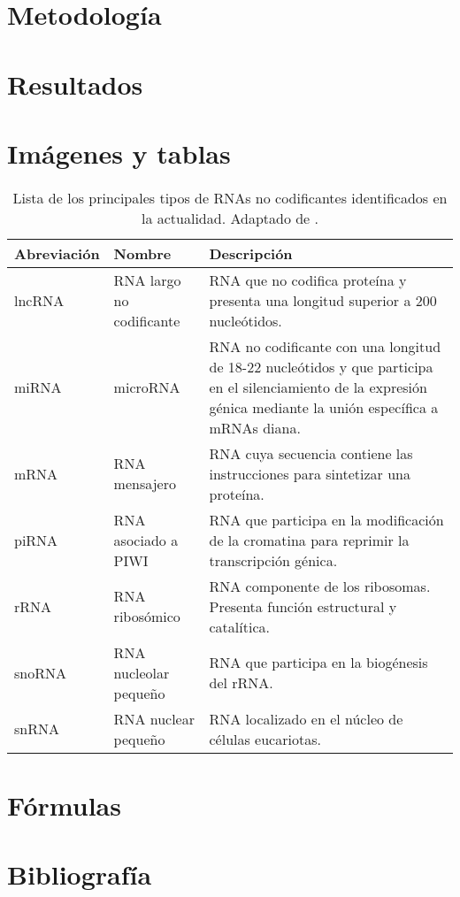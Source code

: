 \documentclass[a4paper,11pt]{article}
\begin{document}
\section{Metodología}


\section{Resultados}



\section{Imágenes y tablas}

\begin{table}
\begin{tabular}{p{2cm}p{5cm}p{9cm}}
\textbf{Abreviación} & \textbf{Nombre} & \textbf{Descripción} \\
\hline
lncRNA & RNA largo no codificante & RNA que no codifica proteína y presenta una longitud superior a 200 nucleótidos. \\
miRNA & microRNA & RNA no codificante con una longitud de 18-22 nucleótidos y que participa en el silenciamiento de la expresión génica mediante la unión específica a mRNAs diana. \\
mRNA & RNA mensajero & RNA cuya secuencia contiene las instrucciones para sintetizar una proteína. \\
piRNA & RNA asociado a PIWI & RNA que participa en la modificación de la cromatina para reprimir la transcripción génica. \\
rRNA & RNA ribosómico & RNA componente de los ribosomas. Presenta función estructural y catalítica. \\
snoRNA & RNA nucleolar pequeño & RNA que participa en la biogénesis del rRNA. \\
snRNA & RNA nuclear pequeño & RNA localizado en el núcleo de células eucariotas. \\
\hline
\end{tabular}
\caption{Lista de los principales tipos de RNAs no codificantes identificados en la actualidad. Adaptado de \cite{Cech2014}.}
\label{table:ncRNAs}
\end{table}





\section{Fórmulas}



\section{Bibliografía}



\end{document}
